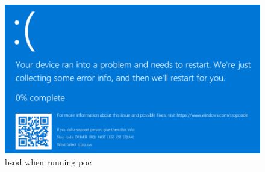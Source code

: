 \documentclass{report}
\begin{document}
\begin{figure}[H]
	\centering
    \includegraphics[width=\textwidth]{bsod.png}
    \caption{\gls{bsod} when running \gls{poc}}
    \label{fig:poc:bsod}
\end{figure}
\end{document}
